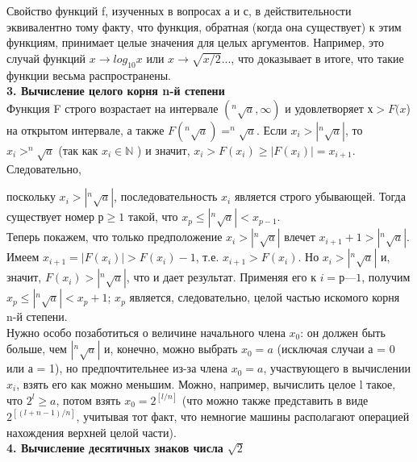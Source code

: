 Свойство функций f, изученных в вопросах а и с, в действительности эквивалентно тому факту, что функция, обратная (когда она существует) к этим функциям, принимает целые значения для целых аргументов. Например, это случай функций $x \longrightarrow log_{10}x$ или $x \longrightarrow \sqrt{x/2}...$, что доказывает в итоге, что такие функции весьма распространены.\\

\noindent
\textbf{3. Вычисление целого корня n-й степени}\\

Функция F строго возрастает на интервале $(^{n}\sqrt{a}, \infty )$ и удовлетворяет $х > F(x$) на открытом интервале, а также $F(^{n}\sqrt{a}) = ^{n}\sqrt{a}$. Если $x_{i} > |^{n}\sqrt{a}|$, то $x_{i} > ^{n}\sqrt{a}$ (так как $x_{i} \in \mathbb{N}$ ) и значит, $x_{i} > F(x_{i}) \geqslant |F(x_{i})| = x_{i+1}$. Следовательно,
\newpage

\noindent
поскольку $x_{i} > |^{n}\sqrt{a}|$, последовательность $x_{i}$ является строго убывающей. Тогда существует номер $р \geqslant 1$ такой, что $x_{p} \leqslant |^{n}\sqrt{a}| < x_{p-1}$.\\

Теперь покажем, что только предположение $x_{i} > |^{n}\sqrt{a}|$ влечет $x_{i+1} + 1 > |^{n}\sqrt{a}|$. Имеем $x_{i+1} = |F(x_{i})| > F(x_{i}) - 1$, т.е. $x_{i+1} > F(x_{i})$. Но $x_{i} > |^{n}\sqrt{a}|$ и, значит, $F(x_{i}) > |^{n}\sqrt{a}|$, что и дает результат. Применяя его к $i = р — 1$, получим $x_{p} \leqslant |^{n}\sqrt{a}| < x_{p} + 1$; $x_{p}$ является, следовательно, целой частью искомого корня n-й степени.\\

Нужно особо позаботиться о величине начального члена $x_{0}$: он должен быть больше, чем $|^{n}\sqrt{a}|$ и, конечно, можно выбрать $x_{0} = a$ (исключая случаи а = 0 или а = 1), но предпочтительнее из-за члена $x_{0} = a$, участвующего в вычислении $x_{i}$, взять его как можно меньшим. Можно, например, вычислить целое l такое, что $2^{l} \geqslant a$, потом взять $x_{0} = 2^{[l/n]}$ (что можно также представить в виде $2^{[(l+n-1)/n]}$, учитывая тот факт, что немногие машины располагают операцией нахождения верхней целой части).\\

\noindent
\textbf{4. Вычисление десятичных знаков числа $\sqrt{2}$}\\

